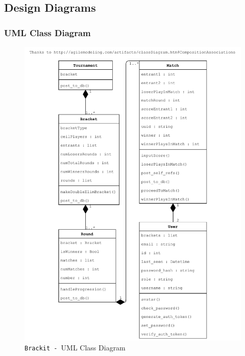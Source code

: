 \documentclass{article}
\begin{document}
\clearpage
\subsection{Design Diagrams}
\subsubsection{UML Class Diagram}
\begin{center}
    \begin{figure}[htp]
        \centering
        \includegraphics[width=13cm]{../diagrams/uml_class_tourn.pdf}
        \caption{\texttt{Brackit - }UML Class Diagram}
        \end{figure}
\end{center}
\clearpage
\end{document}
